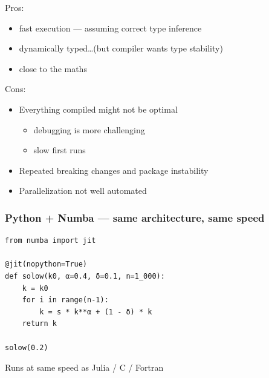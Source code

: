 \begin{frame}
    
    Pros:

    \begin{itemize}
        \item fast execution --- assuming correct type inference
        \vspace{0.2em}
        \item dynamically typed\ldots (but compiler wants type stability)
        \vspace{0.2em}
        \item close to the maths
    \end{itemize}

        \vspace{0.2em}
        \vspace{0.2em}
        \vspace{0.2em}
        \vspace{0.2em}
        \vspace{0.2em}
        \vspace{0.2em}
    Cons:

    \begin{itemize}
        \item Everything compiled might not be optimal 
        \vspace{0.2em}
        \begin{itemize}
            \item debugging is more challenging
            \vspace{0.2em}
            \item slow first runs
            \vspace{0.2em}
        \end{itemize}
        \vspace{0.2em}
        \item Repeated breaking changes and package instability
        \vspace{0.2em}
        \item Parallelization not well automated
    \end{itemize}

\end{frame}

\begin{frame}[fragile]
    \frametitle{Python + Numba --- same architecture, same speed}
    
    \begin{verbatim}
from numba import jit

@jit(nopython=True)
def solow(k0, α=0.4, δ=0.1, n=1_000):
    k = k0
    for i in range(n-1):
        k = s * k**α + (1 - δ) * k
    return k

solow(0.2)
    \end{verbatim}


    Runs at same speed as Julia / C / Fortran

\end{frame}


